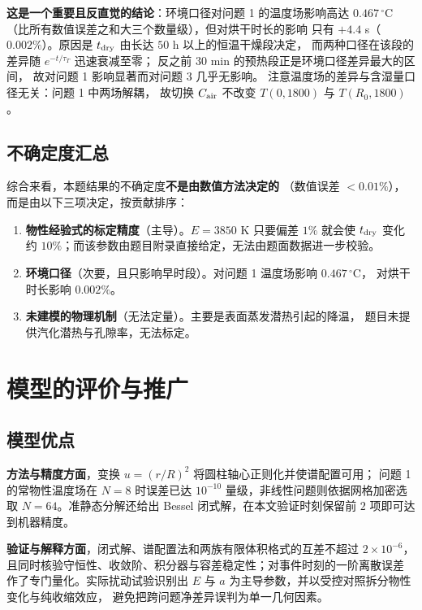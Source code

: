 \documentclass[bwprint]{cumcmthesis}
\begin{document}
\textbf{这是一个重要且反直觉的结论}：环境口径对问题 1 的温度场影响高达
$0.467\,^\circ$C（比所有数值误差之和大三个数量级），但对烘干时长的影响
只有 $+4.4$ s（$0.002\%$）。原因是 $t_{\rm dry}$ 由长达 $50$ h 以上的恒温干燥段决定，
而两种口径在该段的差异随 $e^{-t/\tau_T}$ 迅速衰减至零；
反之前 $30$ min 的预热段正是环境口径差异最大的区间，
故对问题 1 影响显著而对问题 3 几乎无影响。
注意温度场的差异与含湿量口径无关：问题 1 中两场解耦，
故切换 $C_{\rm air}$ 不改变 $T(0,1800)$ 与 $T(R_0,1800)$。

\subsection{不确定度汇总}

综合来看，本题结果的不确定度\textbf{不是由数值方法决定的}
（数值误差 $<0.01\%$），而是由以下三项决定，按贡献排序：

\begin{enumerate}[leftmargin=1.9em,itemsep=2pt]
\item \textbf{物性经验式的标定精度}（主导）。$E=3850$ K 只要偏差 $1\%$ 就会使
$t_{\rm dry}$ 变化约 $10\%$；而该参数由题目附录直接给定，无法由题面数据进一步校验。
\item \textbf{环境口径}（次要，且只影响早时段）。对问题 1 温度场影响 $0.467\,^\circ$C，
对烘干时长影响 $0.002\%$。
\item \textbf{未建模的物理机制}（无法定量）。主要是表面蒸发潜热引起的降温，
题目未提供汽化潜热与孔隙率，无法标定。
\end{enumerate}

\section{模型的评价与推广}
\label{sec:eval}

\subsection{模型优点}

\textbf{方法与精度方面}，变换 $u=(r/R)^2$ 将圆柱轴心正则化并使谱配置可用；
问题 1 的常物性温度场在 $N=8$ 时误差已达 $10^{-10}$ 量级，非线性问题则依据网格加密选取
$N=64$。准静态分解还给出 Bessel 闭式解，在本文验证时刻保留前 $2$ 项即可达到机器精度。

\textbf{验证与解释方面}，闭式解、谱配置法和两族有限体积格式的互差不超过
$2\times10^{-6}$，且同时核验守恒性、收敛阶、积分器与容差稳定性；对事件时刻的一阶离散误差
作了专门量化。实际扰动试验识别出 $E$ 与 $a$ 为主导参数，并以受控对照拆分物性变化与纯收缩效应，
避免把跨问题净差异误判为单一几何因素。
\end{document}
